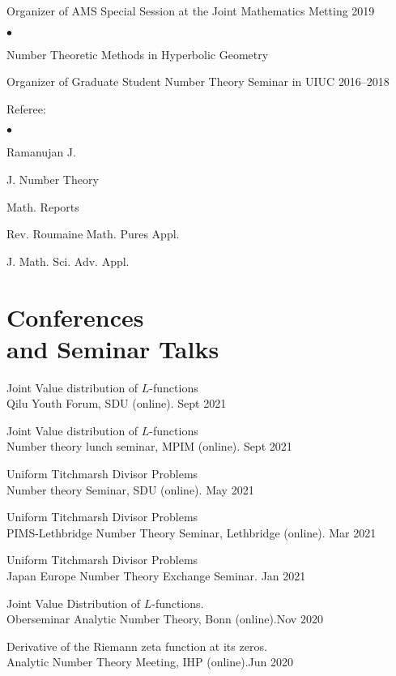 \documentclass[margin,line,pifont,palatino,courier]{res}
\newenvironment{list1}{
  \begin{list}{\ding{113}}{%
      \setlength{\itemsep}{0in}
      \setlength{\parsep}{0in} \setlength{\parskip}{0in}
      \setlength{\topsep}{0in} \setlength{\partopsep}{0in}
      \setlength{\leftmargin}{0.17in}}}{\end{list}}
\newenvironment{list2}{
  \begin{list}{$\bullet$}{%
      \setlength{\itemsep}{0in}
      \setlength{\parsep}{0in} \setlength{\parskip}{0in}
      \setlength{\topsep}{0in} \setlength{\partopsep}{0in}
      \setlength{\leftmargin}{0.2in}}}{\end{list}}
\begin{document}
\begin{resume}
\begin{list1}
	\item{Organizer of AMS Special Session at the Joint Mathematics Metting} {\hfill  2019}
	
	\begin{list2}
		\item Number Theoretic Methods in Hyperbolic Geometry 
	\end{list2}
	\item{Organizer of Graduate Student Number Theory Seminar in UIUC} {\hfill 2016--2018}
	\item Referee: 
	\begin{list2}
		\item Ramanujan J.
		\item J. Number Theory
		\item Math. Reports
		\item  Rev. Roumaine Math. Pures Appl.
		\item  J. Math. Sci. Adv. Appl.
	\end{list2}
	
\end{list1}

\section{\sc Conferences\\ and Seminar Talks}
\begin{list1}
\item{Joint Value distribution of $L$-functions} \\{Qilu Youth Forum, SDU (online)}. {\hfill Sept 2021}	
\item{Joint Value distribution of $L$-functions} \\{Number theory lunch seminar, MPIM (online)}. {\hfill Sept 2021}
\item{Uniform Titchmarsh Divisor Problems} \\{Number theory Seminar, SDU (online)}. {\hfill May 2021}
\item{Uniform Titchmarsh Divisor Problems} \\{PIMS-Lethbridge Number Theory Seminar, Lethbridge (online)}. {\hfill Mar 2021}	
\item{Uniform Titchmarsh Divisor Problems} \\{Japan Europe Number Theory Exchange Seminar}. {\hfill Jan 2021}
\item{ Joint Value Distribution of $L$-functions.} \\{Oberseminar Analytic Number Theory, Bonn (online)}.{\hfill Nov 2020}
\item{ Derivative of the Riemann zeta function at its zeros.} \\{Analytic Number Theory Meeting, IHP (online)}.{\hfill Jun 2020}


\end{list1}
\end{resume}
\end{document}
